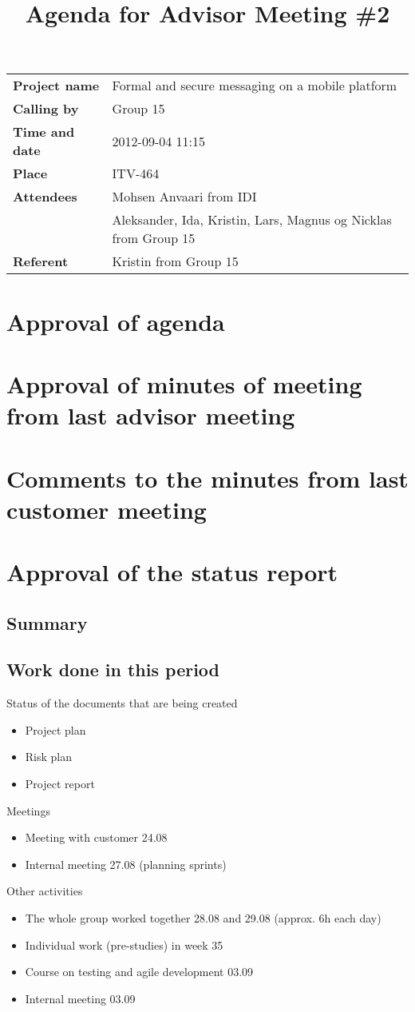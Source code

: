 \documentclass[a4paper,12pt]{article}
\begin{document}
\title{Agenda for Advisor Meeting \#2}
\maketitle
\begin{tabular}{>{\bfseries}l l}	
Project name&Formal and secure messaging on a mobile platform\\
Calling by&Group 15\\
Time and date&2012-09-04 11:15\\
Place&ITV-464\\
Attendees&Mohsen Anvaari from IDI\\
 & Aleksander, Ida, Kristin, Lars, Magnus og Nicklas from Group 15\\
Referent&Kristin from Group 15\\
\end{tabular}

\section{Approval of agenda}
\section{Approval of minutes of meeting from last advisor meeting}
\section{Comments to the minutes from last customer meeting}
\section{Approval of the status report}
\subsection{Summary}
\subsection{Work done in this period}
Status of the documents that are being created
\begin{itemize}
\item
Project plan
\item
Risk plan
\item
Project report
\end{itemize}
Meetings
\begin{itemize}
\item
Meeting with customer 24.08
\item
Internal meeting 27.08 (planning sprints)
\end{itemize}
Other activities
\begin{itemize}
\item
The whole group worked together 28.08 and 29.08 (approx. 6h each day)
\item
Individual work (pre-studies) in week 35
\item
Course on testing and agile development 03.09
\item
Internal meeting 03.09
\end{itemize}
\end{document}
